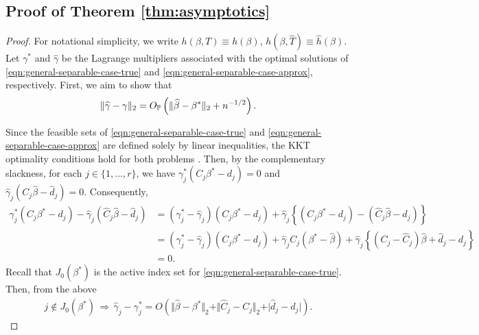 \subsection{Proof of Theorem \ref{thm:asymptotics}} \label{proof:asymptotics}

\begin{proof}
For notational simplicity, we write $h(\beta,T) \equiv h(\beta)$, $h(\beta,\widehat{T}) \equiv \widehat{h}(\beta)$.
Let $\gamma^*$ and $\widehat{\gamma}$ be the Lagrange multipliers associated with the optimal
solutions of \ref{eqn:general-separable-case-true} and \ref{eqn:general-separable-case-approx}, respectively. First, we aim to show that
\begin{align} \label{eqn:proof-2-1}
    \Vert \widehat{\gamma}-\gamma \Vert_2 = O_{\mathbb{P}} \left( \Vert \widehat{\beta} - \beta^* \Vert_2  + n^{-1/2} \right).
\end{align}

Since the feasible sets of \ref{eqn:general-separable-case-true} and \ref{eqn:general-separable-case-approx} are defined solely by linear inequalities, the KKT optimality conditions hold for both problems \citep[][Theorem 5.4]{faigle2013algorithmic}. Then, by the complementary slackness, for each $j \in \{1,...,r\}$, we have $\gamma^*_j (C_j\beta^*-d_j) =0$ and $\widehat{\gamma}_j (C_j\widehat{\beta}-\widehat{d}_j) =0$. Consequently,
\begin{align*}
    \gamma^*_j (C_j\beta^*-d_j) - \widehat{\gamma}_j (\widehat{C}_j\widehat{\beta}-\widehat{d}_j) &= (\gamma^*_j - \widehat{\gamma}_j)(C_j\beta^*-d_j) + \widehat{\gamma}_j\left\{(C_j\beta^*-d_j) - (\widehat{C}_j\widehat{\beta}-\widehat{d}_j)\right\} \\
    &= (\gamma^*_j - \widehat{\gamma}_j)(C_j\beta^*-d_j) + \widehat{\gamma}_jC_j(\beta^* -\widehat{\beta}) 
    + \widehat{\gamma}_j\left\{ (C_j - \widehat{C}_j)\widehat{\beta} +\widehat{d}_j - d_j\right\} \\
    & = 0.
\end{align*}
Recall that $J_0(\beta^*)$ is the active index set for \ref{eqn:general-separable-case-true}. Then, from the above 
\begin{align} \label{eqn:app-proof-thm3-1}
    j \notin J_0(\beta^*) \, \Rightarrow \, \widehat{\gamma}_j - \gamma^*_j  = O\left( \Vert \widehat{\beta}- \beta^* \Vert_2 + \Vert \widehat{C}_j- C_j \Vert_2 + \vert \widehat{d}_j- d_j \vert \right).    
\end{align}


\end{proof}
